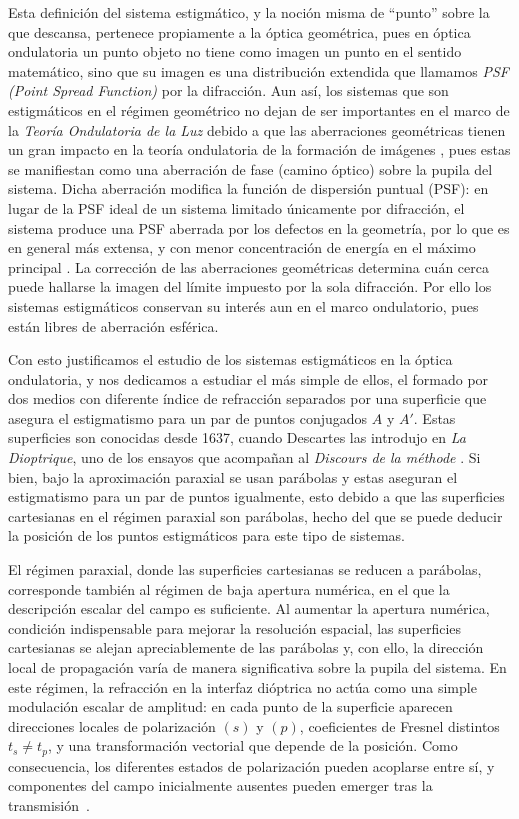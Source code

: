 Esta definición del sistema estigmático, y la noción misma de ``punto''
sobre la que descansa, pertenece propiamente a la óptica geométrica, pues en
óptica ondulatoria un punto objeto no tiene como imagen un punto en el sentido matemático, sino que su imagen es una distribución extendida que llamamos \emph{PSF (Point Spread Function)} por la difracción.
Aun así, los sistemas que son estigmáticos en el régimen geométrico no dejan de ser importantes en el marco de la \emph{Teoría Ondulatoria de la Luz} debido a que las aberraciones geométricas tienen un gran impacto en la teoría ondulatoria de la formación de imágenes \cite{bornwolf1999, zernike1934}, pues estas se manifiestan como una aberración de fase (camino óptico) sobre la pupila del sistema.
Dicha aberración modifica la función de dispersión puntual (PSF): en lugar de la
PSF ideal de un sistema limitado únicamente por difracción, el sistema produce
una PSF aberrada por los defectos en la geometría, por lo que es en general más extensa, y con menor
concentración de energía en el máximo principal \cite{bornwolf1999}. La
corrección de las aberraciones geométricas determina cuán cerca puede hallarse
la imagen del límite impuesto por la sola difracción. Por ello los
sistemas estigmáticos conservan su interés aun en el marco ondulatorio, pues están libres de aberración esférica.

Con esto justificamos el estudio de los sistemas estigmáticos en la óptica ondulatoria, y nos dedicamos a estudiar el más simple de ellos, el formado por dos 
medios con diferente índice de refracción separados por una superficie que asegura el estigmatismo para un par de puntos conjugados $A$ y $A'$. Estas superficies son conocidas desde 1637, cuando Descartes las introdujo en \emph{La Dioptrique}, uno de los ensayos que acompañan al \emph{Discours de la méthode} \cite{dioptrique}. Si bien, bajo la aproximación paraxial se usan parábolas y estas aseguran el estigmatismo para un par de puntos igualmente, esto debido a que las superficies cartesianas en el régimen paraxial son parábolas, hecho del que se puede deducir la posición de los puntos estigmáticos para este tipo de sistemas.

El régimen paraxial, donde las superficies cartesianas se reducen a parábolas, corresponde también al régimen de baja apertura numérica, en el que la descripción escalar del campo es suficiente. Al aumentar la apertura numérica, condición indispensable para mejorar la resolución espacial, las superficies cartesianas se alejan apreciablemente de las parábolas y, con ello, la dirección local de propagación varía de manera significativa sobre la pupila del sistema. En este régimen, la refracción en la interfaz dióptrica no actúa como una simple modulación escalar de amplitud: en cada punto de la superficie aparecen direcciones locales de polarización $(s)$ y $(p)$, coeficientes de Fresnel distintos $t_s \neq t_p$, y una transformación vectorial que depende de la posición. Como consecuencia, los diferentes estados de polarización pueden acoplarse entre sí, y componentes del campo inicialmente ausentes pueden emerger tras la transmisión~\cite{Quabis2000,Dorn2003}.

